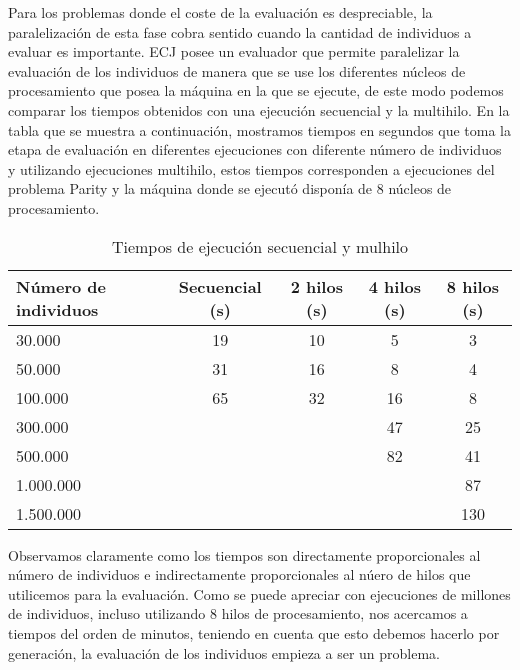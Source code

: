 \label{resultados-parity}

Para los problemas donde el coste de la evaluación es despreciable, la paralelizaci\'on de esta fase cobra sentido cuando la cantidad de individuos a evaluar es importante. ECJ posee un evaluador que permite paralelizar la evaluación de los individuos de manera que se use los diferentes núcleos de procesamiento que posea la m\'aquina en la que se ejecute, de este modo podemos comparar los tiempos obtenidos con una ejecución secuencial y la multihilo. En la tabla que se muestra a continuación, mostramos tiempos en segundos que toma la etapa de evaluación en diferentes ejecuciones con diferente n\'umero de individuos y utilizando ejecuciones multihilo, estos tiempos corresponden a ejecuciones del problema Parity y la m\'aquina donde se ejecut\'o disponía de 8 núcleos de procesamiento.

\begin{table}[H]
  \begin{center}
    \begin{center}
    \begin{tabular}{l | c c c c}
    N\'umero de individuos & Secuencial (s) & 2 hilos (s) & 4 hilos (s) & 8 hilos (s) \\ \hline
    30.000 & 19 & 10 & 5 & 3\\
    50.000 & 31 & 16 & 8 & 4\\
    100.000 & 65 & 32 & 16 & 8\\
    300.000 & & & 47 & 25\\
    500.000 & & & 82 & 41\\
    1.000.000 & & & & 87\\
    1.500.000 & & & & 130\\
    \end{tabular}
    \end{center}
    \caption{Tiempos de ejecución secuencial y mulhilo}
    \label{tabla_tiempos_ecj}
  \end{center}
\end{table}

Observamos claramente como los tiempos son directamente proporcionales al n\'umero de individuos e indirectamente proporcionales al n\'uero de hilos que utilicemos para la evaluación. Como se puede apreciar con ejecuciones de millones de individuos, incluso utilizando 8 hilos de procesamiento, nos acercamos a tiempos del orden de minutos, teniendo en cuenta que esto debemos hacerlo por generación, la evaluación de los individuos empieza a ser un problema. 

